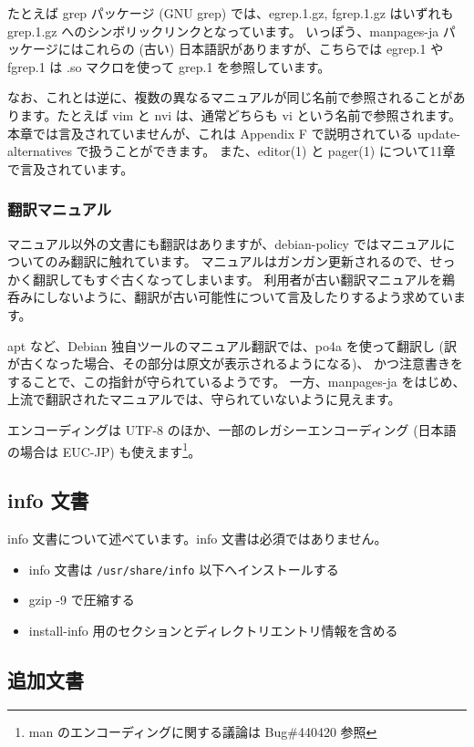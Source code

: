 \documentclass[mingoth,a4paper]{jsarticle}
\begin{document}
たとえば grep パッケージ (GNU grep) では、egrep.1.gz, fgrep.1.gz はいずれも grep.1.gz へのシンボリックリンクとなっています。
いっぽう、manpages-ja パッケージにはこれらの (古い) 日本語訳がありますが、こちらでは egrep.1 や fgrep.1 は .so マクロを使って grep.1 を参照しています。

なお、これとは逆に、複数の異なるマニュアルが同じ名前で参照されることがあります。たとえば vim と nvi は、通常どちらも vi という名前で参照されます。
本章では言及されていませんが、これは Appendix F で説明されている update-alternatives で扱うことができます。
また、editor(1) と pager(1) について11章で言及されています。

\subsubsection{翻訳マニュアル}

マニュアル以外の文書にも翻訳はありますが、debian-policy ではマニュアルについてのみ翻訳に触れています。
マニュアルはガンガン更新されるので、せっかく翻訳してもすぐ古くなってしまいます。
利用者が古い翻訳マニュアルを鵜呑みにしないように、翻訳が古い可能性について言及したりするよう求めています。

apt など、Debian 独自ツールのマニュアル翻訳では、po4a を使って翻訳し (訳が古くなった場合、その部分は原文が表示されるようになる)、
かつ注意書きをすることで、この指針が守られているようです。
一方、manpages-ja をはじめ、上流で翻訳されたマニュアルでは、守られていないように見えます。

エンコーディングは UTF-8 のほか、一部のレガシーエンコーディング (日本語の場合は EUC-JP) も使えます\footnote{man のエンコーディングに関する議論は Bug\#440420 参照}。

\subsection{info 文書}

info 文書について述べています。info 文書は必須ではありません。

\begin{itemize}
\item info 文書は {\tt /usr/share/info} 以下へインストールする
\item gzip -9 で圧縮する
\item install-info 用のセクションとディレクトリエントリ情報を含める
\end{itemize}

\subsection{追加文書}
\end{document}
